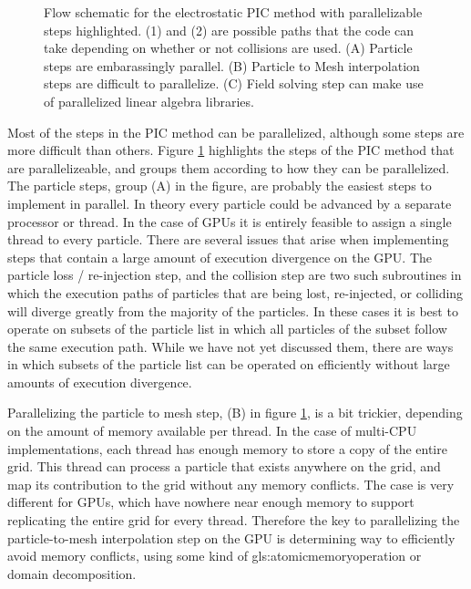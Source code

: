\begin{figure}
\begin{center}

\end{center}
\caption[Parallization opportunities in the PIC method]{Flow schematic for the electrostatic PIC method with parallelizable steps highlighted. (1) and (2) are possible paths that the code can take depending on whether or not collisions are used. (A) Particle steps are embarassingly parallel. (B) Particle to Mesh interpolation steps are difficult to parallelize. (C) Field solving step can make use of parallelized linear algebra libraries.}
\label{fig:pic_flowchart_parallel}
\end{figure}

Most of the steps in the PIC method can be parallelized, although some steps are more difficult than others. Figure \ref{fig:pic_flowchart_parallel} highlights the steps of the PIC method that are parallelizeable, and groups them according to how they can be parallelized. The particle steps, group (A) in the figure, are probably the easiest steps to implement in parallel. In theory every particle could be advanced by a separate processor or thread. In the case of GPUs it is entirely feasible to assign a single thread to every particle. There are several issues that arise when implementing steps that contain a large amount of execution divergence on the GPU. The particle loss / re-injection step, and the collision step are two such subroutines in which the execution paths of particles that are being lost, re-injected, or colliding will diverge greatly from the majority of the particles. In these cases it is best to operate on subsets of the particle list in which all particles of the subset follow the same execution path. While we have not yet discussed them, there are ways in which subsets of the particle list can be operated on efficiently without large amounts of execution divergence. 

Parallelizing the particle to mesh step, (B) in figure \ref{fig:pic_flowchart_parallel}, is a bit trickier, depending on the amount of memory available per thread. In the case of multi-CPU implementations, each thread has enough memory to store a copy of the entire grid. This thread can process a particle that exists anywhere on the grid, and map its contribution to the grid without any memory conflicts. The case is very different for GPUs, which have nowhere near enough memory to support replicating the entire grid for every thread. Therefore the key to parallelizing the particle-to-mesh interpolation step on the GPU is determining way to efficiently avoid memory conflicts, using some kind of \gls{gls:atomicmemoryoperation} or domain decomposition. 

